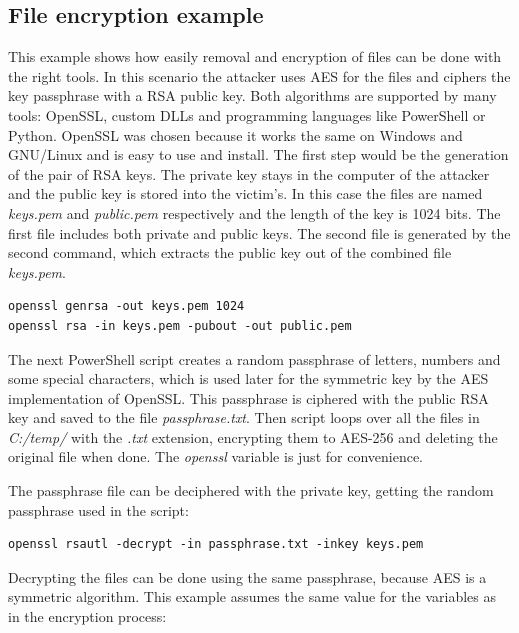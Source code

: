\subsection{File encryption example}
This example shows how easily removal and encryption of files can be done with the right tools.
\linej
In this scenario the attacker uses AES for the files and ciphers the key passphrase with a RSA public key.
Both algorithms are supported by many tools: OpenSSL, custom DLLs and programming languages like PowerShell or Python.
OpenSSL\cite{openssl} was chosen because it works the same on Windows and GNU/Linux and is easy to use and install.
\linej
\linej
The first step would be the generation of the pair of RSA keys.
The private key stays in the computer of the attacker and the public key is stored into the victim's.
In this case the files are named \textit{keys.pem} and \textit{public.pem} respectively and the length of the key is 1024 bits.
The first file includes both private and public keys.
The second file is generated by the second command, which extracts the public key out of the combined file \textit{keys.pem}.
\begin{lstlisting}[style=PS,keywordstyle=\color{black}]
openssl genrsa -out keys.pem 1024
openssl rsa -in keys.pem -pubout -out public.pem
\end{lstlisting}
\linej
The next PowerShell script creates a random passphrase of letters, numbers and some special characters, which is used later for the symmetric key by the AES implementation of OpenSSL.
This passphrase is ciphered with the public RSA key and saved to the file \textit{passphrase.txt}.
Then script loops over all the files in \textit{C:/temp/} with the \textit{.txt} extension, encrypting them to AES-256 and deleting the original file when done.
The \textit{openssl} variable is just for convenience.

\linej
The passphrase file can be deciphered with the private key, getting the random passphrase used in the script:
\begin{lstlisting}[style=PS,keywordstyle=\color{black}]
openssl rsautl -decrypt -in passphrase.txt -inkey keys.pem
\end{lstlisting}
\linej
Decrypting the files can be done using the same passphrase, because AES is a symmetric algorithm.
This example assumes the same value for the variables as in the encryption process:


